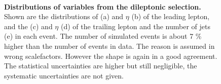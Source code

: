 \begin{figure}[!ht]
\begin{minipage}{\textwidth}
   \end{minipage}\\[1em]
	\caption[Distributions of Variables from the Dileptonic Selection]{\textbf{Distributions of variables from the dileptonic selection.} Shown are the distributions of \pt (a) and $\eta$ (b) of the leading lepton, and the \pt (c) and $\eta$ (d) of the trailing lepton and the number of jets (e) in each event. The number of simulated events is about 7 \% higher than the number of events in data. The reason is assumed in wrong scalefactors. However the shape is again in a good agreement. The statistical uncertainties are higher but still negligible, the systematic uncertainties are not given.}
	\label{fig:ch_6_dilepDist}
\end{figure}
